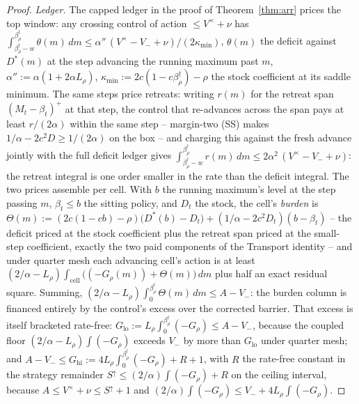 \documentclass[11pt]{article}
\theoremstyle{definition}
\theoremstyle{remark}
\numberwithin{equation}{section}
\begin{document}
\begin{proof}
\emph{Ledger.} The capped ledger in the proof of Theorem~\ref{thm:arr} prices the top window: any crossing control of action $\le V^{\times} + \nu$ has $\int_{\beta^\dagger_\rho - w}^{\beta^\dagger_\rho} \theta(m)\,dm \le \alpha''\,(V^{\times} - V_- + \nu)/(2\kappa_{\min})$, $\theta(m)$ the deficit against $D^\ast(m)$ at the step advancing the running maximum past $m$, $\alpha'' := \alpha(1+2\alpha L_\rho)$, $\kappa_{\min} := 2c(1-c\beta^\dagger_\rho)-\rho$ the stock coefficient at its saddle minimum. The same steps price retreats: writing $r(m)$ for the retreat span $(M_t - \beta_t)^+$ at that step, the control that re-advances across the span pays at least $r/(2\alpha)$ within the same step -- margin-two (SS) makes $1/\alpha - 2c^2 D \ge 1/(2\alpha)$ on the box -- and charging this against the fresh advance jointly with the full deficit ledger gives $\int_{\beta^\dagger_\rho - w}^{\beta^\dagger_\rho} r(m)\,dm \le 2\alpha^2\,(V^{\times} - V_- + \nu)$: the retreat integral is one order smaller in the rate than the deficit integral. The two prices assemble per cell. With $b$ the running maximum's level at the step passing $m$, $\beta_t \le b$ the sitting policy, and $D_t$ the stock, the cell's \emph{burden} is $\Theta(m) := (2c(1-cb)-\rho)\bigl(D^\ast(b) - D_t\bigr) + (1/\alpha - 2c^2D_t)(b - \beta_t)$ -- the deficit priced at the stock coefficient plus the retreat span priced at the small-step coefficient, exactly the two paid components of the Transport identity -- and under quarter mesh each advancing cell's action is at least $(2/\alpha - L_\rho)\int_{\mathrm{cell}}\bigl((-G_\rho(m)) + \Theta(m)\bigr)\,dm$ plus half an exact residual square. Summing, $(2/\alpha - L_\rho)\int_0^{\beta^\dagger_\rho}\Theta(m)\,dm \le A - V_-$: the burden column is financed entirely by the control's excess over the corrected barrier. That excess is itself bracketed rate-free: $G_{\mathrm{lo}} := L_\rho\int_0^{\beta^\dagger_\rho}(-G_\rho) \le A - V_-$, because the coupled floor $(2/\alpha - L_\rho)\int(-G_\rho)$ exceeds $V_-$ by more than $G_{\mathrm{lo}}$ under quarter mesh; and $A - V_- \le G_{\mathrm{hi}} := 4L_\rho\int_0^{\beta^\dagger_\rho}(-G_\rho) + R + 1$, with $R$ the rate-free constant in the strategy remainder $S^{\uparrow} \le (2/\alpha)\int(-G_\rho) + R$ on the ceiling interval, because $A \le V^{\times} + \nu \le S^{\uparrow} + 1$ and $(2/\alpha)\int(-G_\rho) \le V_- + 4L_\rho\int(-G_\rho)$.


\end{proof}
\end{document}
